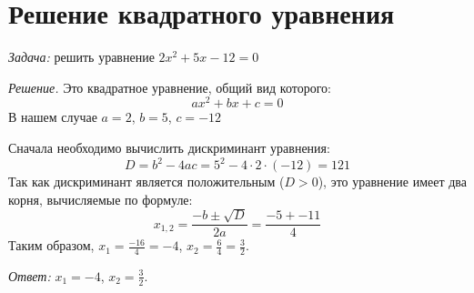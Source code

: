 \documentclass{article}
\begin{document}
\section{Решение квадратного уравнения}
\textit{Задача:} решить уравнение $2x^2 + 5x - 12 = 0$

\textit{Решение.} Это квадратное уравнение, общий вид которого:
\[ax^2 + bx + c = 0\]
В нашем случае $a=2$, $b=5$, $c=-12$

Сначала необходимо вычислить дискриминант уравнения:
\[D = b^2 - 4ac = 5^2 - 4 \cdot 2 \cdot (-12) = 121\]
Так как дискриминант является положительным ($D>0$), это уравнение имеет два корня, вычисляемые по формуле:
\[x_{1, 2} = \frac{-b \pm \sqrt{D}}{2a} = \frac{-5 +- 11}{4}\]
Таким образом, $x_1 = \frac{-16}{4} = -4$, $x_2 = \frac{6}{4} = \frac{3}{2}$.

\textit{Ответ:} $x_1 = -4$, $x_2 = \frac{3}{2}$.
\end{document}
